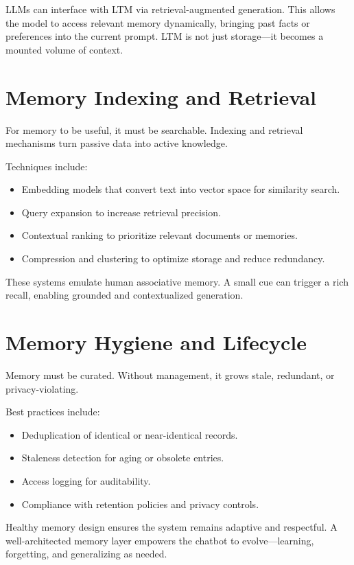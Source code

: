 \documentclass{book}
\begin{document}
LLMs can interface with LTM via retrieval-augmented generation. This allows the model to access relevant memory dynamically, bringing past facts or preferences into the current prompt. LTM is not just storage—it becomes a mounted volume of context.

\section{Memory Indexing and Retrieval}

For memory to be useful, it must be searchable. Indexing and retrieval mechanisms turn passive data into active knowledge.

Techniques include:

\begin{itemize}
  \item Embedding models that convert text into vector space for similarity search.
  \item Query expansion to increase retrieval precision.
  \item Contextual ranking to prioritize relevant documents or memories.
  \item Compression and clustering to optimize storage and reduce redundancy.
\end{itemize}

These systems emulate human associative memory. A small cue can trigger a rich recall, enabling grounded and contextualized generation.

\section{Memory Hygiene and Lifecycle}

Memory must be curated. Without management, it grows stale, redundant, or privacy-violating.

Best practices include:

\begin{itemize}
  \item Deduplication of identical or near-identical records.
  \item Staleness detection for aging or obsolete entries.
  \item Access logging for auditability.
  \item Compliance with retention policies and privacy controls.
\end{itemize}

Healthy memory design ensures the system remains adaptive and respectful. A well-architected memory layer empowers the chatbot to evolve—learning, forgetting, and generalizing as needed.
\end{document}

